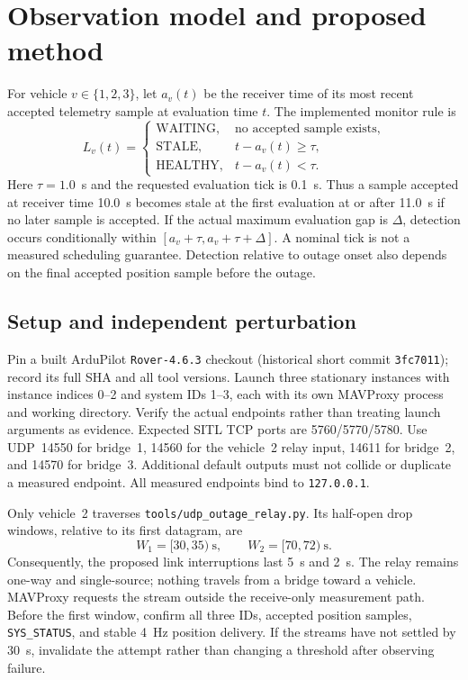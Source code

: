 \documentclass[10pt,a4paper]{article}
\begin{document}
\section{Observation model and proposed method}
For vehicle $v\in\{1,2,3\}$, let $a_v(t)$ be the receiver time of its most
recent accepted telemetry sample at evaluation time $t$. The implemented
monitor rule is
\begin{equation}
L_v(t)=\begin{cases}
\mathrm{WAITING},&\text{no accepted sample exists},\\
\mathrm{STALE},&t-a_v(t)\geq\tau,\\
\mathrm{HEALTHY},&t-a_v(t)<\tau.
\end{cases}
\label{eq:state}
\end{equation}
Here $\tau=1.0$~s and the requested evaluation tick is 0.1~s.
Thus a sample accepted at receiver time 10.0~s becomes stale at the first
evaluation at or after 11.0~s if no later sample is accepted. If the actual
maximum evaluation gap is $\Delta$, detection occurs conditionally within
$[a_v+\tau,a_v+\tau+\Delta]$. A nominal tick is not a measured scheduling
guarantee. Detection relative to outage onset also depends on the final
accepted position sample before the outage.

\newpage
\subsection{Setup and independent perturbation}
Pin a built ArduPilot \texttt{Rover-4.6.3} checkout (historical short commit
\texttt{3fc7011}); record its full SHA and all tool versions. Launch three
stationary instances with instance indices 0--2 and system IDs 1--3, each
with its own MAVProxy process and working directory. Verify the actual
endpoints rather than treating launch arguments as evidence. Expected SITL
TCP ports are 5760/5770/5780. Use UDP~14550 for bridge~1,
14560 for the vehicle~2 relay input, 14611 for bridge~2, and 14570 for
bridge~3. Additional default outputs must not collide or duplicate a
measured endpoint. All measured endpoints bind to \texttt{127.0.0.1}.

Only vehicle~2 traverses \texttt{tools/udp\_outage\_relay.py}.
Its half-open drop windows, relative to its first datagram, are
\begin{equation}
W_1=[30,35)\ \mathrm{s},\qquad W_2=[70,72)\ \mathrm{s}.
\end{equation}
Consequently, the proposed link interruptions last 5~s and 2~s. The relay
remains one-way and single-source; nothing travels from a bridge toward a
vehicle. MAVProxy requests the stream outside the receive-only measurement
path. Before the first window, confirm all three IDs, accepted position
samples, \texttt{SYS\_STATUS}, and stable 4~Hz position delivery. If the
streams have not settled by 30~s, invalidate the attempt rather than
changing a threshold after observing failure.
\end{document}
